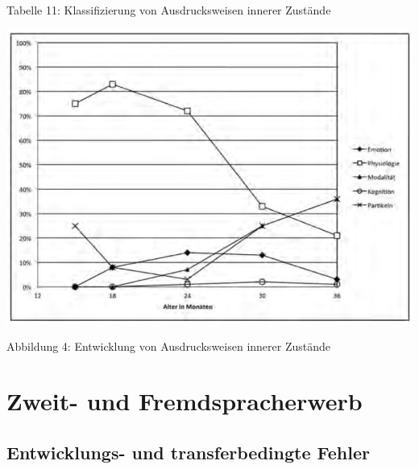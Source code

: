 \documentclass[
  letterpaper,
]{scrbook}
\begin{document}
Tabelle 11: Klassifizierung von Ausdrucksweisen innerer Zustände

\includegraphics[width=1\textwidth,height=\textheight]{./pictures/kauschke_abb4.png}

Abbildung 4: Entwicklung von Ausdrucksweisen innerer Zustände

\part{Zweit- und Fremdspracherwerb}

\hypertarget{sec-gender}{%
\chapter{Entwicklungs- und transferbedingte Fehler}\label{sec-gender}}
\end{document}
